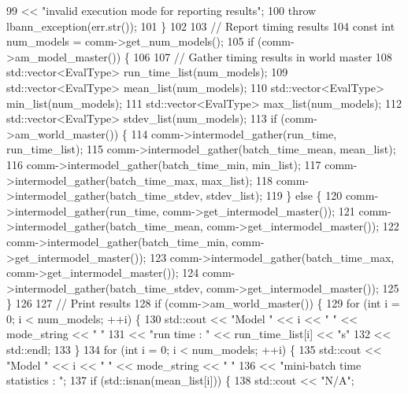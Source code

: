 \begin{DoxyCode}
99         << \textcolor{stringliteral}{"invalid execution mode for reporting results"};
100     \textcolor{keywordflow}{throw} lbann\_exception(err.str());
101   \}
102 
103   \textcolor{comment}{// Report timing results}
104   \textcolor{keyword}{const} \textcolor{keywordtype}{int} num\_models = comm->get\_num\_models();
105   \textcolor{keywordflow}{if} (comm->am\_model\_master()) \{
106 
107     \textcolor{comment}{// Gather timing results in world master}
108     std::vector<EvalType> run\_time\_list(num\_models);
109     std::vector<EvalType> mean\_list(num\_models);
110     std::vector<EvalType> min\_list(num\_models);
111     std::vector<EvalType> max\_list(num\_models);
112     std::vector<EvalType> stdev\_list(num\_models);
113     \textcolor{keywordflow}{if} (comm->am\_world\_master()) \{
114       comm->intermodel\_gather(run\_time, run\_time\_list);
115       comm->intermodel\_gather(batch\_time\_mean, mean\_list);
116       comm->intermodel\_gather(batch\_time\_min, min\_list);
117       comm->intermodel\_gather(batch\_time\_max, max\_list);
118       comm->intermodel\_gather(batch\_time\_stdev, stdev\_list);
119     \} \textcolor{keywordflow}{else} \{
120       comm->intermodel\_gather(run\_time, comm->get\_intermodel\_master());
121       comm->intermodel\_gather(batch\_time\_mean, comm->get\_intermodel\_master());
122       comm->intermodel\_gather(batch\_time\_min, comm->get\_intermodel\_master());
123       comm->intermodel\_gather(batch\_time\_max, comm->get\_intermodel\_master());
124       comm->intermodel\_gather(batch\_time\_stdev, comm->get\_intermodel\_master());
125     \}
126 
127     \textcolor{comment}{// Print results}
128     \textcolor{keywordflow}{if} (comm->am\_world\_master()) \{
129       \textcolor{keywordflow}{for} (\textcolor{keywordtype}{int} i = 0; i < num\_models; ++i) \{
130         std::cout << \textcolor{stringliteral}{"Model "} << i << \textcolor{stringliteral}{" "} << mode\_string << \textcolor{stringliteral}{" "}
131                   << \textcolor{stringliteral}{"run time : "} << run\_time\_list[i] << \textcolor{stringliteral}{"s"}
132                   << std::endl;
133       \}
134       \textcolor{keywordflow}{for} (\textcolor{keywordtype}{int} i = 0; i < num\_models; ++i) \{
135         std::cout << \textcolor{stringliteral}{"Model "} << i << \textcolor{stringliteral}{" "} << mode\_string << \textcolor{stringliteral}{" "}
136                   << \textcolor{stringliteral}{"mini-batch time statistics : "};
137         \textcolor{keywordflow}{if} (std::isnan(mean\_list[i])) \{
138           std::cout << \textcolor{stringliteral}{"N/A"};

\end{DoxyCode}
